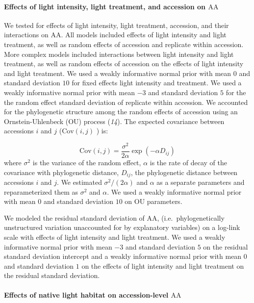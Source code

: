 \documentclass[
  letterpaper,
  DIV=11,
  numbers=noendperiod]{scrartcl}
\let\oldparagraph\paragraph
\renewcommand{\paragraph}[1]{\oldparagraph{#1}\mbox{}}
\newcommand{\aax}{$\mathrm{AA}$}
\begin{document}
\paragraph{\texorpdfstring{Effects of light intensity, light treatment,
and accession on
\aax}{Effects of light intensity, light treatment, and accession on }}\label{effects-of-light-intensity-light-treatment-and-accession-on}

We tested for effects of light intensity, light treatment, accession,
and their interactions on \aax. All models included effects of light
intensity and light treatment, as well as random effects of accession
and replicate within accession. More complex models included
interactions between light intensity and light treatment, as well as
random effects of accession on the effects of light intensity and light
treatment. We used a weakly informative normal prior with mean \(0\) and
standard deviation \(10\) for fixed effects light intensity and
treatment. We used a weakly informative normal prior with mean \(-3\)
and standard deviation \(5\) for the the random effect standard
deviation of replicate within accession. We accounted for the
phylogenetic structure among the random effects of accession using an
Ornstein-Uhlenbeck (OU) process (\emph{14}). The expected covariance
between accessions \(i\) and \(j\) (\(\text{Cov}(i, j)\) ) is:

\[\text{Cov}(i, j) = \frac{\sigma^2}{2 \alpha} \exp(-\alpha D_{ij})\]
where \(\sigma^2\) is the variance of the random effect, \(\alpha\) is
the rate of decay of the covariance with phylogenetic distance,
\(D_{ij}\), the phylogenetic distance between accessions \(i\) and
\(j\). We estimated \(\sigma^2 / (2 \alpha)\) and \(\alpha\) as a
separate parameters and reparameterized them as \(\sigma^2\) and
\(\alpha\). We used a weakly informative normal prior with mean \(0\)
and standard deviation \(10\) on OU parameters.

We modeled the residual standard deviation of \aax,
(i.e.~phylogenetically unstructured variation unaccounted for by
explanatory variables) on a log-link scale with effects of light
intensity and light treatment. We used a weakly informative normal prior
with mean \(-3\) and standard deviation \(5\) on the residual standard
deviation intercept and a weakly informative normal prior with mean
\(0\) and standard deviation \(1\) on the effects of light intensity and
light treatment on the residual standard deviation.

\paragraph{\texorpdfstring{Effects of native light habitat on
accession-level
\aax}{Effects of native light habitat on accession-level }}\label{effects-of-native-light-habitat-on-accession-level}
\end{document}
